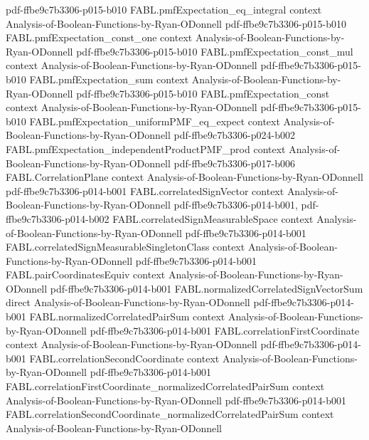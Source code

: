 \begin{theorem}
  {pdf-ffbe9c7b3306-p015-b010}
\proofstep
  {FABL.pmfExpectation_eq_integral}
  {context}
  {Analysis-of-Boolean-Functions-by-Ryan-ODonnell}
  {pdf-ffbe9c7b3306-p015-b010}
\proofstep
  {FABL.pmfExpectation_const_one}
  {context}
  {Analysis-of-Boolean-Functions-by-Ryan-ODonnell}
  {pdf-ffbe9c7b3306-p015-b010}
\proofstep
  {FABL.pmfExpectation_const_mul}
  {context}
  {Analysis-of-Boolean-Functions-by-Ryan-ODonnell}
  {pdf-ffbe9c7b3306-p015-b010}
\proofstep
  {FABL.pmfExpectation_sum}
  {context}
  {Analysis-of-Boolean-Functions-by-Ryan-ODonnell}
  {pdf-ffbe9c7b3306-p015-b010}
\proofstep
  {FABL.pmfExpectation_const}
  {context}
  {Analysis-of-Boolean-Functions-by-Ryan-ODonnell}
  {pdf-ffbe9c7b3306-p015-b010}
\proofstep
  {FABL.pmfExpectation_uniformPMF_eq_expect}
  {context}
  {Analysis-of-Boolean-Functions-by-Ryan-ODonnell}
  {pdf-ffbe9c7b3306-p024-b002}
\proofstep
  {FABL.pmfExpectation_independentProductPMF_prod}
  {context}
  {Analysis-of-Boolean-Functions-by-Ryan-ODonnell}
  {pdf-ffbe9c7b3306-p017-b006}
\proofstep
  {FABL.CorrelationPlane}
  {context}
  {Analysis-of-Boolean-Functions-by-Ryan-ODonnell}
  {pdf-ffbe9c7b3306-p014-b001}
\proofstep
  {FABL.correlatedSignVector}
  {context}
  {Analysis-of-Boolean-Functions-by-Ryan-ODonnell}
  {pdf-ffbe9c7b3306-p014-b001,
    pdf-ffbe9c7b3306-p014-b002}
\proofstep
  {FABL.correlatedSignMeasurableSpace}
  {context}
  {Analysis-of-Boolean-Functions-by-Ryan-ODonnell}
  {pdf-ffbe9c7b3306-p014-b001}
\proofstep
  {FABL.correlatedSignMeasurableSingletonClass}
  {context}
  {Analysis-of-Boolean-Functions-by-Ryan-ODonnell}
  {pdf-ffbe9c7b3306-p014-b001}
\proofstep
  {FABL.pairCoordinatesEquiv}
  {context}
  {Analysis-of-Boolean-Functions-by-Ryan-ODonnell}
  {pdf-ffbe9c7b3306-p014-b001}
\proofstep
  {FABL.normalizedCorrelatedSignVectorSum}
  {direct}
  {Analysis-of-Boolean-Functions-by-Ryan-ODonnell}
  {pdf-ffbe9c7b3306-p014-b001}
\proofstep
  {FABL.normalizedCorrelatedPairSum}
  {context}
  {Analysis-of-Boolean-Functions-by-Ryan-ODonnell}
  {pdf-ffbe9c7b3306-p014-b001}
\proofstep
  {FABL.correlationFirstCoordinate}
  {context}
  {Analysis-of-Boolean-Functions-by-Ryan-ODonnell}
  {pdf-ffbe9c7b3306-p014-b001}
\proofstep
  {FABL.correlationSecondCoordinate}
  {context}
  {Analysis-of-Boolean-Functions-by-Ryan-ODonnell}
  {pdf-ffbe9c7b3306-p014-b001}
\proofstep
  {FABL.correlationFirstCoordinate_normalizedCorrelatedPairSum}
  {context}
  {Analysis-of-Boolean-Functions-by-Ryan-ODonnell}
  {pdf-ffbe9c7b3306-p014-b001}
\proofstep
  {FABL.correlationSecondCoordinate_normalizedCorrelatedPairSum}
  {context}
  {Analysis-of-Boolean-Functions-by-Ryan-ODonnell}

\end{theorem}
